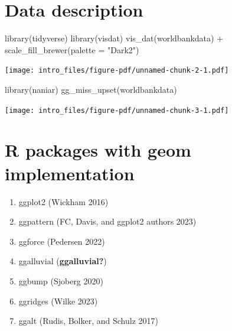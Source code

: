 \documentclass[
  letterpaper,
  DIV=11,
  numbers=noendperiod]{scrreprt}
\newenvironment{Shaded}{\begin{snugshade}}{\end{snugshade}}
\newcommand{\AttributeTok}[1]{\textcolor[rgb]{0.40,0.45,0.13}{#1}}
\newcommand{\FunctionTok}[1]{\textcolor[rgb]{0.28,0.35,0.67}{#1}}
\newcommand{\NormalTok}[1]{\textcolor[rgb]{0.00,0.23,0.31}{#1}}
\newcommand{\SpecialCharTok}[1]{\textcolor[rgb]{0.37,0.37,0.37}{#1}}
\newcommand{\StringTok}[1]{\textcolor[rgb]{0.13,0.47,0.30}{#1}}
\begin{document}
\section*{Data description}\label{data-description}


\begin{Shaded}
\begin{Highlighting}[]
\FunctionTok{library}\NormalTok{(tidyverse)}
\FunctionTok{library}\NormalTok{(visdat)}
\FunctionTok{vis\_dat}\NormalTok{(worldbankdata) }\SpecialCharTok{+} 
  \FunctionTok{scale\_fill\_brewer}\NormalTok{(}\AttributeTok{palette =} \StringTok{"Dark2"}\NormalTok{)}
\end{Highlighting}
\end{Shaded}

\texttt{[image: intro\_files/figure-pdf/unnamed-chunk-2-1.pdf]}

\begin{Shaded}
\begin{Highlighting}[]
\FunctionTok{library}\NormalTok{(naniar)}
\FunctionTok{gg\_miss\_upset}\NormalTok{(worldbankdata) }
\end{Highlighting}
\end{Shaded}

\texttt{[image: intro\_files/figure-pdf/unnamed-chunk-3-1.pdf]}

\section*{R packages with geom
implementation}\label{r-packages-with-geom-implementation}


\begin{enumerate}
\def\labelenumi{\arabic{enumi}.}
\item
  ggplot2 (Wickham 2016)
\item
  ggpattern (FC, Davis, and ggplot2 authors 2023)
\item
  ggforce (Pedersen 2022)
\item
  ggalluvial (\textbf{ggalluvial?})
\item
  ggbump (Sjoberg 2020)
\item
  ggridges (Wilke 2023)
\item
  ggalt (Rudis, Bolker, and Schulz 2017)
\end{enumerate}
\end{document}
